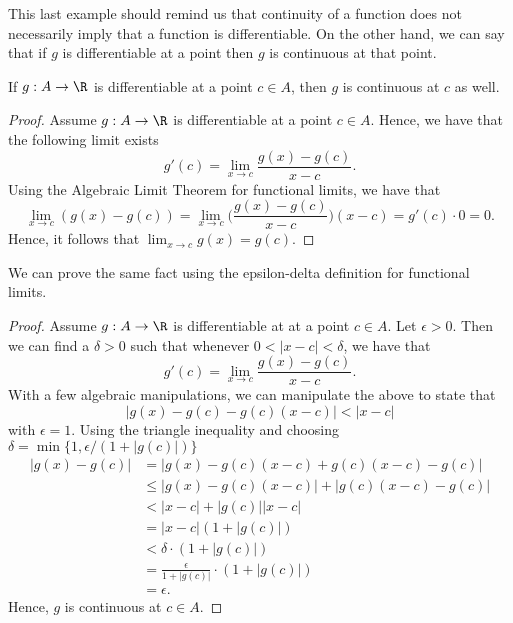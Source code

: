 This last example should remind us that continuity of a function does not necessarily imply that a function is differentiable. On the other hand, we can say that if \( g \) is differentiable at a point then \( g  \) is continuous at that point. 

\begin{tcolorbox}
\begin{thm}
If \( g: A \to \R  \) is differentiable at a point \( c \in A  \), then \( g  \) is continuous at \( c  \) as well.
\end{thm}
\end{tcolorbox}

\begin{proof}
Assume \( g: A \to \R  \) is differentiable at a point \( c \in A  \). Hence, we have that the following limit exists
    \[ g'(c) = \lim_{ x \to c } \frac{ g(x) - g(c)  }{ x - c  }. \]
    Using the Algebraic Limit Theorem for functional limits, we have that 
    \[  \lim_{ x \to c  } (g(x) - g(c) ) = \lim_{ x \to c  } \Big( \frac{ g(x) - g(c)  }{ x - c  }  \Big) (x - c) = g'(c) \cdot 0 = 0. \]
    Hence, it follows that \( \lim_{ x \to c  } g(x) = g(c). \)
\end{proof}

We can prove the same fact using the epsilon-delta definition for functional limits. 
\begin{proof}
Assume \( g: A \to \R  \) is differentiable at at a point \( c \in A  \). Let \( \epsilon > 0  \). Then we can find a \( \delta > 0  \) such that whenever \( 0 < | x - c  | < \delta  \), we have that
    \[ g'(c) = \lim_{ x \to c } \frac{ g(x) - g(c)  }{ x - c  }. \]
    With a few algebraic manipulations, we can manipulate the above to state that
    \[  | g(x) - g(c) - g(c)(x-c)  | <  | x - c  | \tag{1}  \]
    with \( \epsilon = 1  \).
Using the triangle inequality and choosing \( \delta = \min \{ 1 , \epsilon / (1   + | g(c) | ) \}  \) 
\begin{align*}
    | g(x) - g(c)  | &= | g(x) - g(c)(x-c) + g(c)(x-c) -  g(c) |  \\
                     &\leq | g(x) - g(c)(x-c) | + | g(c)(x-c) - g(c) | \\
                     &< | x - c  | + | g(c)  | | x - c  | \\
                     &= | x - c  | (1 + | g(c) | ) \\
                     &<  \delta \cdot (1 + | g(c)  | ) \\
                     &= \frac{ \epsilon  }{ 1 + | g(c)  |  }  \cdot (1 + | g(c)  | ) \\
                     &= \epsilon.
\end{align*}
Hence, \( g  \) is continuous at \( c \in A  \).
\end{proof}


